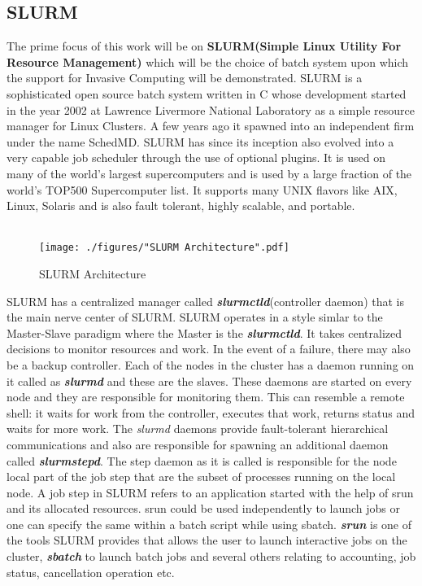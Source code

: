 \subsection{SLURM}
The prime focus of this work will be on \textbf{SLURM(Simple Linux Utility For Resource Management)} which will be the choice of batch system upon which the support for Invasive Computing will be demonstrated. SLURM is a sophisticated open source batch system written in C whose development started in the year 2002 at Lawrence Livermore National Laboratory as a simple resource manager for Linux Clusters. A few years ago it spawned into an independent firm under the name SchedMD. SLURM has since its inception also evolved into a very capable job scheduler through the use of optional plugins. It is used on many of the world's largest supercomputers and is used by a large fraction of the world's TOP500 Supercomputer list. It supports many UNIX flavors like AIX, Linux, Solaris and is also fault tolerant, highly scalable, and portable.\\ \\
\begin{figure}[!ht]
\centering
\texttt{[image: ./figures/"SLURM Architecture".pdf]}
\caption{SLURM Architecture}
\label{fig:6}
\end{figure}
\noindent
SLURM has a centralized manager called \textbf{\textit{slurmctld}}(controller daemon) that is the main nerve center of SLURM. SLURM operates in a style simlar to the Master-Slave paradigm where the Master is the \textbf{\textit{slurmctld}}. It takes centralized decisions to monitor resources and work. In the event of a failure, there may also be a backup controller. Each of the nodes in the cluster has a daemon running on it called as \textbf{\textit{slurmd}} and these are the slaves. These daemons are started on every node and they are responsible for monitoring them. This can resemble a remote shell: it waits for work from the controller, executes that work, returns status and waits for more work. The \textit{slurmd} daemons provide fault-tolerant hierarchical communications and also are responsible for spawning an additional daemon called \textbf{\textit{slurmstepd}}. The step daemon as it is called is responsible for the node local part of the job step that are the subset of processes running on the local node. A job step in SLURM refers to an application started with the help of srun and its allocated resources. srun could be used independently to launch jobs or one can specify the same within a batch script while using sbatch. \textbf{\textit{srun}} is one of the tools SLURM provides that allows the user to launch interactive jobs on the cluster, \textbf{\textit{sbatch}} to launch batch jobs and several others relating to accounting, job status, cancellation operation etc.\\ \\
